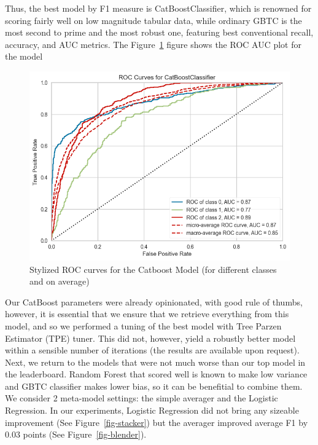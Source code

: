 \documentclass[
  letterpaper,
  DIV=11,
  numbers=noendperiod]{scrartcl}
\begin{document}
Thus, the best model by F1 measure is CatBoostClassifier, which is
renowned for scoring fairly well on low magnitude tabular data, while
ordinary GBTC is the most second to prime and the most robust one,
featuring best conventional recall, accuracy, and AUC metrics. The
Figure~\ref{fig-rocauc} figure shows the ROC AUC plot for the model

\begin{figure}

{\centering \includegraphics{report_AzadhdhinNedalYunisAlFraijat_files/figure-pdf/fig-rocauc-output-1.png}

}

\caption{\label{fig-rocauc}Stylized ROC curves for the Catboost Model
(for different classes and on average)}

\end{figure}

Our CatBoost parameters were already opinionated, with good rule of
thumbs, however, it is essential that we ensure that we retrieve
everything from this model, and so we performed a tuning of the best
model with Tree Parzen Estimator (TPE) tuner. This did not, however,
yield a robustly better model within a sensible number of iterations
(the results are available upon request). Next, we return to the models
that were not much worse than our top model in the leaderboard. Random
Forest that scored well is known to make low variance and GBTC
classifier makes lower bias, so it can be benefitial to combine them. We
consider 2 meta-model settings: the simple averager and the Logistic
Regression. In our experiments, Logistic Regression did not bring any
sizeable improvement (See Figure~\ref{fig-stacker}) but the averager
improved average F1 by 0.03 points (See Figure~\ref{fig-blender}).
\end{document}
